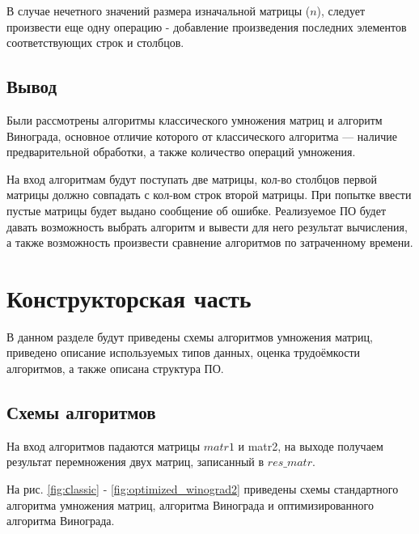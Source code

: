 \documentclass[a4paper,14pt, unknownkeysallowed]{extreport}
\begin{document}
В случае нечетного значений размера изначальной матрицы ($n$), следует произвести еще одну операцию - добавление произведения последних элементов соответствующих строк и столбцов.

\section*{Вывод}
Были рассмотрены алгоритмы классического умножения матриц и алгоритм Винограда, основное отличие которого от классического алгоритма — наличие предварительной обработки, а также количество операций умножения.

На вход алгоритмам будут поступать две матрицы, кол-во столбцов первой матрицы должно совпадать с кол-вом строк второй матрицы. При попытке ввести пустые матрицы будет выдано сообщение об ошибке. Реализуемое ПО будет давать возможность выбрать алгоритм и вывести для него результат вычисления, а также возможность произвести сравнение алгоритмов по затраченному времени.



\chapter{Конструкторская часть}
В данном разделе будут приведены схемы алгоритмов умножения матриц, приведено описание используемых типов данных, оценка трудоёмкости алгоритмов, а также описана структура ПО.

\section{Схемы алгоритмов}

На вход алгоритмов падаются матрицы $matr1$ и matr2, на выходе получаем результат перемножения двух матриц, записанный в $res\_matr$.

На рис. \ref{fig:сlassic} - \ref{fig:optimized_winograd2} приведены схемы стандартного алгоритма умножения матриц, алгоритма Винограда и оптимизированного алгоритма Винограда.

\clearpage
\end{document}
